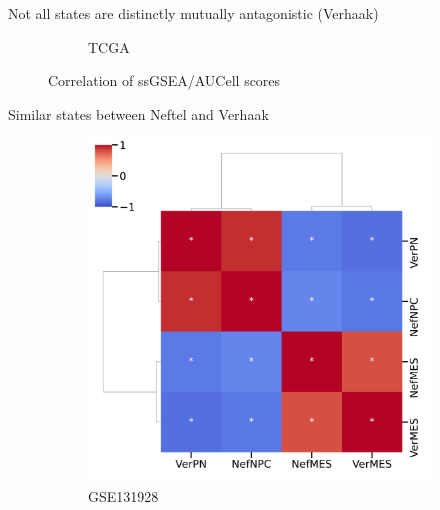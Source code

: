 \documentclass[aspectratio=169,9pt]{beamer}
\begin{document}
\begin{frame}{Not all states are distinctly mutually antagonistic (Verhaak)}
\begin{adjustwidth}{-5cm}{-5cm}
\begin{figure}
\begin{subfigure}[c]{0.4\textwidth}
                    \caption{TCGA}
                \end{subfigure}
                \caption{Correlation of ssGSEA/AUCell scores}
            \end{figure}
        \end{adjustwidth}
    \end{frame}

    \begin{frame}{Similar states between Neftel and Verhaak}
        \begin{adjustwidth}{-5cm}{-5cm}
            \centering
            \begin{figure}\ContinuedFloat
                \centering
                \begin{subfigure}[c]{0.4\textwidth}
                    \centering
                    \includegraphics[width=\textwidth]{GSEA_GSM3828672_corrplot_2D}
                    \caption{GSE131928}
                \end{subfigure}
                \begin{subfigure}[c]{0.4\textwidth}
                    \centering

\end{subfigure}
\end{figure}
\end{adjustwidth}
\end{frame}
\end{document}
